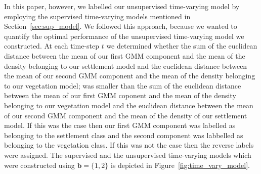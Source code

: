 \documentclass{article}
\begin{document}
In this paper, however, we labelled our unsupervised time-varying model by employing the supervised time-varying models mentioned in Section~\ref{sec:sup_model}. We followed this approach, because 
we wanted to quantify the optimal performance of the unsupervised time-varying model we constructed. At each time-step $t$ we 
determined whether the sum of the euclidean distance between the mean of our first GMM component and the mean of the density belonging to our settlement model and the euclidean distance 
between the mean of our second GMM component and the mean of the density belonging to our vegetation model; was smaller than the sum of the euclidean distance between the mean of our first GMM coponent and the mean of the density 
belonging to our vegetation model and the euclidean distance between the mean of our second GMM component and the mean of the density of our settlement model. If this was the case then our first GMM component 
was labelled as belonging to the settlement class and the second component was labbelled as belonging to the vegetation class. If this was not the case then 
the reverse labels were assigned. The supervised and the unsupervised time-varying models which were constructed using $\mathbf{b}=\{1,2\}$ is depicted in Figure~\ref{fig:time_vary_model}.

% 


\end{document}
